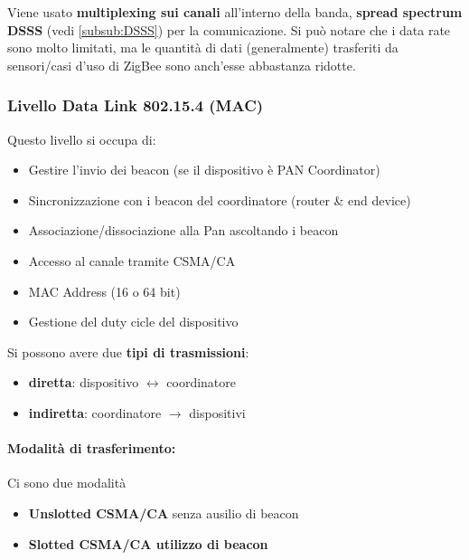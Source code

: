 Viene usato \textbf{multiplexing sui canali} all'interno della banda, \textbf{spread spectrum DSSS} (vedi \ref{subsub:DSSS}) per la comunicazione. Si può notare che i data rate sono molto limitati, ma le quantità di dati (generalmente) trasferiti da sensori/casi d'uso di ZigBee sono anch'esse abbastanza ridotte.

\subsubsection{Livello Data Link 802.15.4 (MAC)}

Questo livello si occupa di:
\begin{itemize}
	\item Gestire l'invio dei beacon (se il dispositivo è PAN Coordinator)

	\item Sincronizzazione con i beacon del coordinatore (router \& end device)

	\item Associazione/dissociazione alla Pan ascoltando i beacon

	\item Accesso al canale tramite CSMA/CA

	\item MAC Address (16 o 64 bit)

	\item Gestione del duty cicle del dispositivo
\end{itemize}

Si possono avere due \textbf{tipi di trasmissioni}: 
\begin{itemize}
	\item \textbf{diretta}: dispositivo $\leftrightarrow$ coordinatore

	\item \textbf{indiretta}: coordinatore $\rightarrow$ dispositivi
\end{itemize}

\paragraph{Modalità di trasferimento:} Ci sono due modalità
\begin{itemize}
	\item \textbf{Unslotted CSMA/CA} senza ausilio di beacon
	
    \item \textbf{Slotted CSMA/CA utilizzo di beacon}
\end{itemize}


